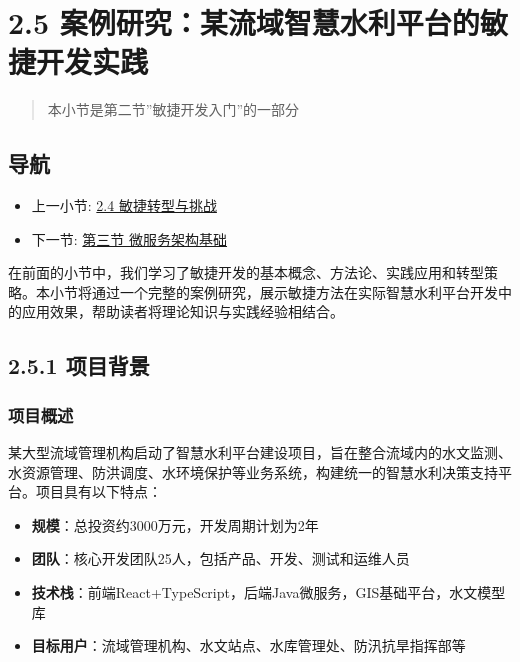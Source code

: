 \section{2.5
案例研究：某流域智慧水利平台的敏捷开发实践}\label{ux6848ux4f8bux7814ux7a76ux67d0ux6d41ux57dfux667aux6167ux6c34ux5229ux5e73ux53f0ux7684ux654fux6377ux5f00ux53d1ux5b9eux8df5}

\begin{quote}
本小节是第二节''敏捷开发入门''的一部分
\end{quote}

\subsection{导航}\label{ux5bfcux822a}

\begin{itemize}
\tightlist
\item
  上一小节: \href{section03-02-04.md}{2.4 敏捷转型与挑战}
\item
  下一节: \href{section03-03.md}{第三节 微服务架构基础}
\end{itemize}

在前面的小节中，我们学习了敏捷开发的基本概念、方法论、实践应用和转型策略。本小节将通过一个完整的案例研究，展示敏捷方法在实际智慧水利平台开发中的应用效果，帮助读者将理论知识与实践经验相结合。

\subsection{2.5.1 项目背景}\label{ux9879ux76eeux80ccux666f}

\subsubsection{项目概述}\label{ux9879ux76eeux6982ux8ff0}

某大型流域管理机构启动了智慧水利平台建设项目，旨在整合流域内的水文监测、水资源管理、防洪调度、水环境保护等业务系统，构建统一的智慧水利决策支持平台。项目具有以下特点：

\begin{itemize}
\tightlist
\item
  \textbf{规模}：总投资约3000万元，开发周期计划为2年
\item
  \textbf{团队}：核心开发团队25人，包括产品、开发、测试和运维人员
\item
  \textbf{技术栈}：前端React+TypeScript，后端Java微服务，GIS基础平台，水文模型库
\item
  \textbf{目标用户}：流域管理机构、水文站点、水库管理处、防汛抗旱指挥部等
\end{itemize}

